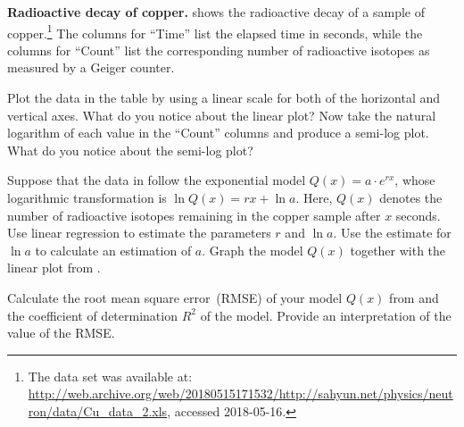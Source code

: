 \documentclass[a4paper,oneside,12pt]{article}
\begin{document}
\begin{table}[!htbp]
\centering

\caption{%
  The radioactive decay of a sample of $9.7656$ grams of copper.  The
  sample was neutron activated for $66$ minutes.  Then a Geiger
  counter was used to measure the number of radioactive isotopes after
  the elapse of the listed number of seconds.  The experiment was
  performed by Steven Sahyun at the University of Wisconsin at
  Whitewater, USA on $13$-th January~$2005$.
}
\label{tab:logarithm:copper_radioactive_decay}
\end{table}

\begin{exercise}
\textbf{Radioactive decay of copper.}
 shows the radioactive
decay of a sample of copper.\footnote{
  The data set was available at:
  \url{http://web.archive.org/web/20180515171532/http://sahyun.net/physics/neutron/data/Cu_data_2.xls},
  accessed 2018-05-16.
}
The columns for ``Time'' list the elapsed time in seconds, while the
columns for ``Count'' list the corresponding number of radioactive
isotopes as measured by a Geiger counter.
\begin{packedenum}
\item\label{subex:logarithm:copper_decay_linear_log_plots}
  Plot the data in the table by using a linear scale for both of the
  horizontal and vertical axes.  What do you notice about the linear
  plot?  Now take the natural logarithm of each value in the ``Count''
  columns and produce a semi-log plot.  What do you notice about the
  semi-log plot?

\item\label{subex:logarithm:copper_decay_regression}
  Suppose that the data in
   follow the
  exponential model $Q(x) = a \cdot e^{rx}$, whose logarithmic
  transformation is $\ln Q(x) = rx + \ln a$.  Here, $Q(x)$ denotes the
  number of radioactive isotopes remaining in the copper sample after
  $x$ seconds.  Use linear regression to estimate the parameters $r$
  and $\ln a$.  Use the estimate for $\ln a$ to calculate an
  estimation of $a$.  Graph the model $Q(x)$ together with the linear
  plot from .

\item\label{subex:logarithm:copper_decay_RMS_error_Pearson_rho}
  Calculate the root mean square error~(RMSE) of your model $Q(x)$
  from  and the
  coefficient of determination $R^2$ of the model.  Provide an
  interpretation of the value of the RMSE.
\end{packedenum}
\end{exercise}
\end{document}
